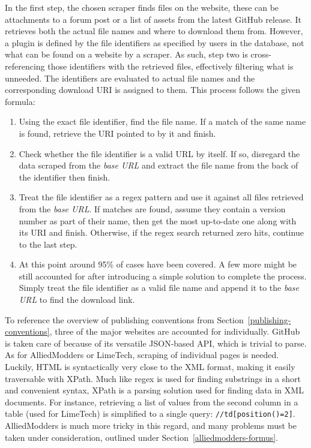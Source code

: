 In the first step, the chosen scraper finds files on the website, these can be attachments to a forum post or a list of assets from the latest GitHub release.
It retrieves both the actual file names and where to download them from.
However, a plugin is defined by the file identifiers as specified by users in the database, not what can be found on a website by a scraper.
As such, step two is cross-referencing those identifiers with the retrieved files, effectively filtering what is unneeded.
The identifiers are evaluated to actual file names and the corresponding download URI is assigned to them.
This process follows the given formula:
\begin{enumerate}
\item
Using the exact file identifier, find the file name.
If a match of the same name is found, retrieve the URI pointed to by it and finish.

\item
Check whether the file identifier is a valid URL by itself.
If so, disregard the data scraped from the \textit{base URL} and extract the file name from the back of the identifier then finish.

\item
Treat the file identifier as a regex pattern and use it against all files retrieved from the \textit{base URL}.
If matches are found, assume they contain a version number as part of their name, then get the most up-to-date one along with its URI and finish.
Otherwise, if the regex search returned zero hits, continue to the last step.

\item
At this point around 95\% of cases have been covered.
A few more might be still accounted for after introducing a simple solution to complete the process.
Simply treat the file identifier as a valid file name and append it to the \textit{base URL} to find the download link.

\end{enumerate}

To reference the overview of publishing conventions from Section~\ref{publishing-conventions}, three of the major websites are accounted for individually.
GitHub is taken care of because of its versatile JSON-based API, which is trivial to parse.
As for AlliedModders or LimeTech, scraping of individual pages is needed.
Luckily, HTML is syntactically very close to the XML format, making it easily traversable with XPath.
Much like regex is used for finding substrings in a short and convenient syntax, XPath is a parsing solution used for finding data in XML documents.
For instance, retrieving a list of values from the second column in a table (used for LimeTech) is simplified to a single query: \verb|//td[position()=2]|.
AlliedModders is much more tricky in this regard, and many problems must be taken under consideration, outlined under Section~\ref{alliedmodders-formus}.

